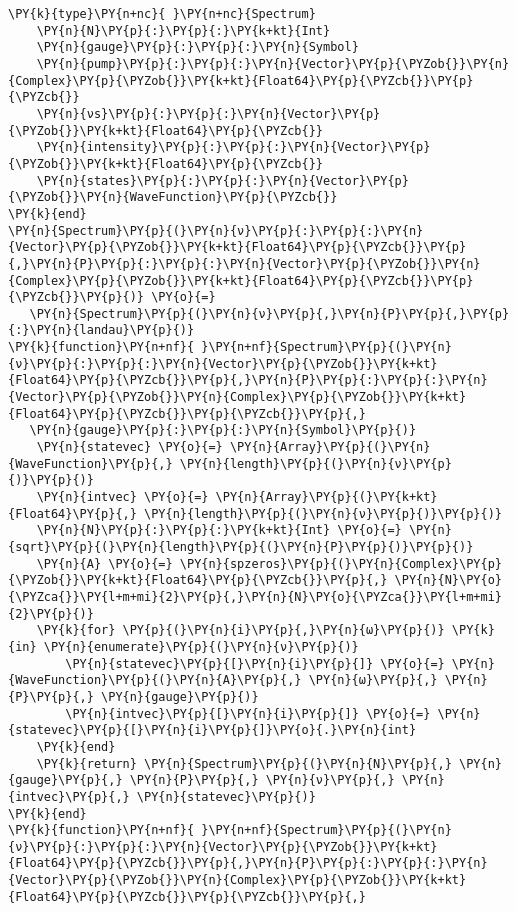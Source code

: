 \begin{Verbatim}[commandchars=\\\{\}]
\PY{k}{type}\PY{n+nc}{ }\PY{n+nc}{Spectrum}
    \PY{n}{N}\PY{p}{:}\PY{p}{:}\PY{k+kt}{Int}
    \PY{n}{gauge}\PY{p}{:}\PY{p}{:}\PY{n}{Symbol}
    \PY{n}{pump}\PY{p}{:}\PY{p}{:}\PY{n}{Vector}\PY{p}{\PYZob{}}\PY{n}{Complex}\PY{p}{\PYZob{}}\PY{k+kt}{Float64}\PY{p}{\PYZcb{}}\PY{p}{\PYZcb{}}
    \PY{n}{νs}\PY{p}{:}\PY{p}{:}\PY{n}{Vector}\PY{p}{\PYZob{}}\PY{k+kt}{Float64}\PY{p}{\PYZcb{}}
    \PY{n}{intensity}\PY{p}{:}\PY{p}{:}\PY{n}{Vector}\PY{p}{\PYZob{}}\PY{k+kt}{Float64}\PY{p}{\PYZcb{}}
    \PY{n}{states}\PY{p}{:}\PY{p}{:}\PY{n}{Vector}\PY{p}{\PYZob{}}\PY{n}{WaveFunction}\PY{p}{\PYZcb{}}
\PY{k}{end}
\PY{n}{Spectrum}\PY{p}{(}\PY{n}{ν}\PY{p}{:}\PY{p}{:}\PY{n}{Vector}\PY{p}{\PYZob{}}\PY{k+kt}{Float64}\PY{p}{\PYZcb{}}\PY{p}{,}\PY{n}{P}\PY{p}{:}\PY{p}{:}\PY{n}{Vector}\PY{p}{\PYZob{}}\PY{n}{Complex}\PY{p}{\PYZob{}}\PY{k+kt}{Float64}\PY{p}{\PYZcb{}}\PY{p}{\PYZcb{}}\PY{p}{)} \PY{o}{=}
   \PY{n}{Spectrum}\PY{p}{(}\PY{n}{ν}\PY{p}{,}\PY{n}{P}\PY{p}{,}\PY{p}{:}\PY{n}{landau}\PY{p}{)}
\PY{k}{function}\PY{n+nf}{ }\PY{n+nf}{Spectrum}\PY{p}{(}\PY{n}{ν}\PY{p}{:}\PY{p}{:}\PY{n}{Vector}\PY{p}{\PYZob{}}\PY{k+kt}{Float64}\PY{p}{\PYZcb{}}\PY{p}{,}\PY{n}{P}\PY{p}{:}\PY{p}{:}\PY{n}{Vector}\PY{p}{\PYZob{}}\PY{n}{Complex}\PY{p}{\PYZob{}}\PY{k+kt}{Float64}\PY{p}{\PYZcb{}}\PY{p}{\PYZcb{}}\PY{p}{,}
   \PY{n}{gauge}\PY{p}{:}\PY{p}{:}\PY{n}{Symbol}\PY{p}{)}
    \PY{n}{statevec} \PY{o}{=} \PY{n}{Array}\PY{p}{(}\PY{n}{WaveFunction}\PY{p}{,} \PY{n}{length}\PY{p}{(}\PY{n}{ν}\PY{p}{)}\PY{p}{)}
    \PY{n}{intvec} \PY{o}{=} \PY{n}{Array}\PY{p}{(}\PY{k+kt}{Float64}\PY{p}{,} \PY{n}{length}\PY{p}{(}\PY{n}{ν}\PY{p}{)}\PY{p}{)}
    \PY{n}{N}\PY{p}{:}\PY{p}{:}\PY{k+kt}{Int} \PY{o}{=} \PY{n}{sqrt}\PY{p}{(}\PY{n}{length}\PY{p}{(}\PY{n}{P}\PY{p}{)}\PY{p}{)}
    \PY{n}{A} \PY{o}{=} \PY{n}{spzeros}\PY{p}{(}\PY{n}{Complex}\PY{p}{\PYZob{}}\PY{k+kt}{Float64}\PY{p}{\PYZcb{}}\PY{p}{,} \PY{n}{N}\PY{o}{\PYZca{}}\PY{l+m+mi}{2}\PY{p}{,}\PY{n}{N}\PY{o}{\PYZca{}}\PY{l+m+mi}{2}\PY{p}{)}
    \PY{k}{for} \PY{p}{(}\PY{n}{i}\PY{p}{,}\PY{n}{ω}\PY{p}{)} \PY{k}{in} \PY{n}{enumerate}\PY{p}{(}\PY{n}{ν}\PY{p}{)}
        \PY{n}{statevec}\PY{p}{[}\PY{n}{i}\PY{p}{]} \PY{o}{=} \PY{n}{WaveFunction}\PY{p}{(}\PY{n}{A}\PY{p}{,} \PY{n}{ω}\PY{p}{,} \PY{n}{P}\PY{p}{,} \PY{n}{gauge}\PY{p}{)}
        \PY{n}{intvec}\PY{p}{[}\PY{n}{i}\PY{p}{]} \PY{o}{=} \PY{n}{statevec}\PY{p}{[}\PY{n}{i}\PY{p}{]}\PY{o}{.}\PY{n}{int}
    \PY{k}{end}
    \PY{k}{return} \PY{n}{Spectrum}\PY{p}{(}\PY{n}{N}\PY{p}{,} \PY{n}{gauge}\PY{p}{,} \PY{n}{P}\PY{p}{,} \PY{n}{ν}\PY{p}{,} \PY{n}{intvec}\PY{p}{,} \PY{n}{statevec}\PY{p}{)}
\PY{k}{end}
\PY{k}{function}\PY{n+nf}{ }\PY{n+nf}{Spectrum}\PY{p}{(}\PY{n}{ν}\PY{p}{:}\PY{p}{:}\PY{n}{Vector}\PY{p}{\PYZob{}}\PY{k+kt}{Float64}\PY{p}{\PYZcb{}}\PY{p}{,}\PY{n}{P}\PY{p}{:}\PY{p}{:}\PY{n}{Vector}\PY{p}{\PYZob{}}\PY{n}{Complex}\PY{p}{\PYZob{}}\PY{k+kt}{Float64}\PY{p}{\PYZcb{}}\PY{p}{\PYZcb{}}\PY{p}{,}

\end{Verbatim}
